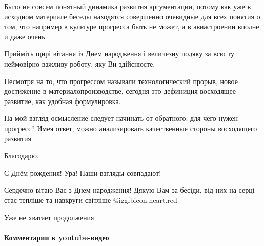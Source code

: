 \begin{itemize}
Было не совсем понятный динамика развития аргументации, потому как уже в
исходном материале беседы находятся совершенно очевидные для всех понятия о
том, что например в культуре прогресса быть не может, а в авиастроении вполне и
даже очень.


Прийміть щирі вітання із Днем народження і величезну подяку за всю ту
неймовірно важливу роботу, яку Ви здійснюєте.


Несмотря на то, что прогрессом называли технологический прорыв, новое
достижение в материалопроизводстве, сегодня это дефиниция восходящее развитие,
как удобная формулировка.

На мой взгляд осмысление следует начинать от обратного: для чего нужен
прогресс? Имея ответ, можно анализировать качественные стороны восходящего
развития

Благодарю.

С Днём рождения! Ура! Наши взгляды совпадают!

Сердечно вітаю Вас з Днем народження! Дякую Вам за бесіди, від них на серці стає тепліше та навкруги світліше 
@igg{fbicon.heart.red}

Уже не хватает продолжения

\end{itemize} %

\paragraph{Комментарии к youtube-видео}

